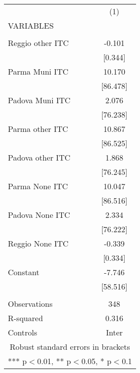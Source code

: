 \begin{tabular}{lc} \hline
 & (1) \\
VARIABLES &  \\ \hline
 &  \\
Reggio other ITC & -0.101 \\
 & [0.344] \\
Parma Muni ITC & 10.170 \\
 & [86.478] \\
Padova Muni ITC & 2.076 \\
 & [76.238] \\
Parma other ITC & 10.867 \\
 & [86.525] \\
Padova other ITC & 1.868 \\
 & [76.245] \\
Parma None ITC & 10.047 \\
 & [86.516] \\
Padova None ITC & 2.334 \\
 & [76.222] \\
Reggio None ITC & -0.339 \\
 & [0.334] \\
Constant & -7.746 \\
 & [58.516] \\
 &  \\
Observations & 348 \\
R-squared & 0.316 \\
 Controls & Inter \\ \hline
\multicolumn{2}{c}{ Robust standard errors in brackets} \\
\multicolumn{2}{c}{ *** p$<$0.01, ** p$<$0.05, * p$<$0.1} \\
\end{tabular}
